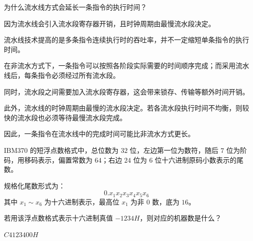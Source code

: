 \begin{question}
为什么流水线方式会延长一条指令的执行时间？
\end{question}

\begin{answer}
因为流水线会引入流水段寄存器开销，且时钟周期由最慢流水段决定。
\end{answer}

\begin{analysisenv}
流水线技术提高的是多条指令连续执行时的吞吐率，并不一定缩短单条指令的执行时间。

在非流水方式下，一条指令可以按照各阶段实际需要的时间顺序完成；而采用流水线后，每条指令必须经过所有流水段。

同时，流水段之间需要加入流水段寄存器，这会带来锁存、传输等额外时间开销。

此外，流水线的时钟周期由最慢的流水段决定。若各流水段执行时间不均衡，则较快的流水段也必须等待最慢流水段完成。

因此，一条指令在流水线中的完成时间可能比非流水方式更长。
\end{analysisenv}

\begin{question}
IBM370 的短浮点数格式中，总位数为 $32$ 位，左边第一位为数符，随后 $7$ 位为阶码，用移码表示，偏置常数为 $64$；右边 $24$ 位为 $6$ 位十六进制原码小数表示的尾数。

规格化尾数形式为：
\[
0.x_1x_2x_3x_4x_5x_6
\]
其中 $x_1 \sim x_6$ 为十六进制表示，最高位 $x_1$ 为非 $0$ 数，底为 $16$。

若用该浮点数格式表示十六进制真值 $-1234H$，则对应的机器数是什么？
\end{question}

\begin{answer}
$C4123400H$
\end{answer}

